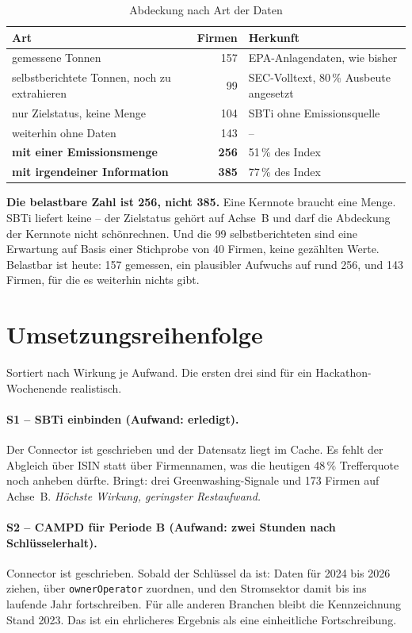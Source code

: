 \documentclass[11pt,a4paper]{article}
\newcommand{\befund}[1]{%
  \par\vspace{2pt}\noindent\colorbox{softgrey}{%
  \begin{minipage}{\dimexpr\linewidth-2\fboxsep}\small\vspace{3pt}#1\vspace{3pt}\end{minipage}}\par\vspace{4pt}}
\begin{document}
\begin{table}[htbp]
\centering\small
\caption{Abdeckung nach Art der Daten}
\label{tab:bilanz}
\begin{tabular}{lrl}
\toprule
\textbf{Art} & \textbf{Firmen} & \textbf{Herkunft} \\
\midrule
gemessene Tonnen & 157 & EPA-Anlagendaten, wie bisher \\
selbstberichtete Tonnen, noch zu extrahieren & 99 & SEC-Volltext, 80\,\% Ausbeute angesetzt \\
nur Zielstatus, keine Menge & 104 & SBTi ohne Emissionsquelle \\
weiterhin ohne Daten & 143 & -- \\
\midrule
\textbf{mit einer Emissionsmenge} & \textbf{256} & 51\,\% des Index \\
\textbf{mit irgendeiner Information} & \textbf{385} & 77\,\% des Index \\
\bottomrule
\end{tabular}
\end{table}

\befund{\textbf{Die belastbare Zahl ist 256, nicht 385.} Eine Kernnote braucht eine Menge. SBTi liefert keine -- der Zielstatus gehört auf Achse~B und darf die Abdeckung der Kernnote nicht schönrechnen. Und die 99 selbstberichteten sind eine Erwartung auf Basis einer Stichprobe von 40 Firmen, keine gezählten Werte. Belastbar ist heute: 157 gemessen, ein plausibler Aufwuchs auf rund 256, und 143 Firmen, für die es weiterhin nichts gibt.}

\section{Umsetzungsreihenfolge}
\label{sec:reihenfolge}

Sortiert nach Wirkung je Aufwand. Die ersten drei sind für ein Hackathon-Wochenende realistisch.

\paragraph{S1 -- SBTi einbinden (Aufwand: erledigt).}
Der Connector ist geschrieben und der Datensatz liegt im Cache. Es fehlt der Abgleich über ISIN statt über Firmennamen, was die heutigen 48\,\% Trefferquote noch anheben dürfte. Bringt: drei Greenwashing-Signale und 173 Firmen auf Achse~B. \emph{Höchste Wirkung, geringster Restaufwand.}

\paragraph{S2 -- CAMPD für Periode B (Aufwand: zwei Stunden nach Schlüsselerhalt).}
Connector ist geschrieben. Sobald der Schlüssel da ist: Daten für 2024 bis 2026 ziehen, über \texttt{ownerOperator} zuordnen, und den Stromsektor damit bis ins laufende Jahr fortschreiben. Für alle anderen Branchen bleibt die Kennzeichnung \glqq Stand 2023\grqq. Das ist ein ehrlicheres Ergebnis als eine einheitliche Fortschreibung.
\end{document}
